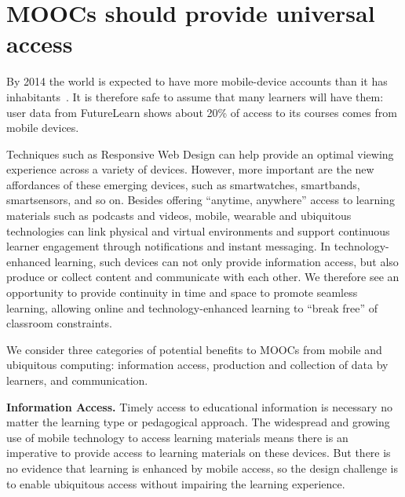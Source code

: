 \section{MOOCs should provide universal access}



By 2014 the world is expected to have more mobile-device accounts than
it has inhabitants~\cite{siliconindia-mobile-device-growth}.
It is therefore safe to assume that many learners will have them: 
user data from FutureLearn shows about 20\% of access to its courses comes from mobile
devices. 

Techniques such as Responsive Web Design can help provide an optimal
viewing experience across a variety of devices.
However, more important are the new affordances of these emerging
devices, such as  smartwatches, smartbands,
smartsensors, and so on.
Besides offering ``anytime, anywhere'' access to learning materials such
as podcasts and videos, mobile, wearable and ubiquitous technologies can
link  physical and virtual environments and 
support continuous learner engagement through
notifications and instant messaging. In technology-enhanced learning,
such devices can not only provide information access, but
also produce or collect content and communicate with each other.
We therefore see an opportunity to provide continuity in time and
space to promote seamless learning, allowing online and
technology-enhanced learning to ``break free'' of classroom constraints.

We consider three categories of potential benefits to MOOCs from mobile
and ubiquitous 
computing: information access, production and
collection of data by learners, and communication.

\textbf{Information Access.}  Timely access to educational information is 
necessary no matter the learning type or
pedagogical approach. The widespread and growing use of mobile
technology to access learning materials means there is an imperative to
provide access to learning materials on these devices. But there is no
evidence that learning is enhanced by mobile
access, so the design challenge is to enable ubiquitous access without
impairing the learning experience.  

